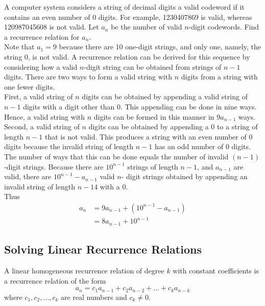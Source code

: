 \documentclass[12pt]{article}
\begin{document}
\begin{example} A computer system considers a string of decimal digits a valid codeword if it contains an even number of 0 digits. For example, 1230407869 is valid, whereas 120987045608 is not valid. Let $a_n$ be the number of valid $n$-digit codewords. Find a recurrence relation for $a_n$. \\ Note that $a_1 = 9$ because there are 10 one-digit strings, and only one, namely, the string 0, is not valid. A recurrence relation can be derived for this sequence by considering how a valid $n$-digit string can be obtained from strings of $n - 1$ digits. There are two ways to form a valid string with $n$ digits from a string with one fewer digits. \\ First, a valid string of $n$ digits can be obtained by appending a valid string of $n - 1$ digits with a digit other than 0. This appending can be done in nine ways. Hence, a valid string with $n$ digits can be formed in this manner in $9a_{n - 1}$ ways. \\ Second, a valid string of $n$ digits can be obtained by appending a 0 to a string of length $n - 1$ that is not valid. This produces a string with an even number of 0 digits because the invalid string of length $n - 1$ has an odd number of 0 digits. The number of ways that this can be done equals the number of invalid $(n - 1)$-digit strings. Because there are $10^{n - 1}$ strings of length $n - 1$, and $a_{n - 1}$ are valid, there are $10^{n - 1} - a_{n - 1}$ valid $n$- digit strings obtained by appending an invalid string of length $n - 14$ with a 0. \\ 
Thus $$\begin{aligned} a_n &= 9a_{n - 1} + (10^{n - 1} - a_{n - 1}) \\ &= 8a_{n - 1} + 10^{n - 1} \end{aligned} $$ \end{example} 

\subsection{Solving Linear Recurrence Relations}

\begin{definition} A linear homogeneous recurrence relation of degree $k$ with constant coefficients is a recurrence relation of the form $$a_n = c_1a_{n - 1} + c_2a_{n - 2} + \dots + c_ka_{n - k} $$ where $c_1, c_2, \dots, c_k$ are real numbers and $c_k \neq 0$. \end{definition} 
\end{document}
